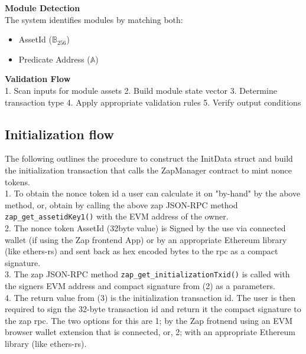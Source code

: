 \textbf{Module Detection}\\
The system identifies modules by matching both:
\begin{itemize}
    \item AssetId ($\mathbb{B}_{256}$)
    \item Predicate Address ($\mathbb{A}$)
\end{itemize}

\textbf{Validation Flow}\\
1. Scan inputs for module assets
2. Build module state vector
3. Determine transaction type
4. Apply appropriate validation rules
5. Verify output conditions







\subsection{Initialization flow}



The following outlines the procedure to construct the InitData struct and build the initialization transaction that calls the ZapManager
contract to mint nonce tokens.\\

1. To obtain the nonce token id a user can calculate it on "by-hand" by the above method, or, obtain by calling the above zap JSON-RPC method \texttt{zap\_get\_assetidKey1()} with the EVM address
of the owner.\\

2. The nonce token AssetId (32byte value) is Signed by the use via connected wallet (if using the Zap frontend App) or by an appropriate Ethereum library (like ethers-rs)
and sent back as hex encoded bytes to the rpc as a compact signature.\\

3. The zap JSON-RPC method \texttt{zap\_get\_initializationTxid()} is called with the signers EVM address and compact signature from (2) as a parameters.\\

4. The return value from (3) is the initialization transaction id. The user is then required to sign the 32-byte transaction id and return it the compact signature
to the zap rpc. The two options for this are 1; by the Zap frotnend using an EVM browser wallet extension that is connected, or, 2; with an appropriate
Ethereum library (like ethers-rs).\\

